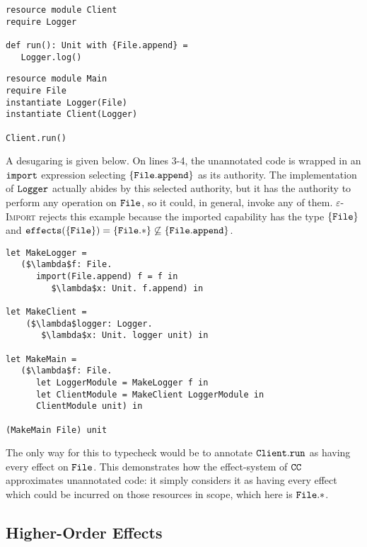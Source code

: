 \begin{lstlisting}
resource module Client
require Logger

def run(): Unit with {File.append} =
   Logger.log()
\end{lstlisting}

\begin{lstlisting}
resource module Main
require File
instantiate Logger(File)
instantiate Client(Logger)

Client.run()
\end{lstlisting}

A desugaring is given below. On lines 3-4, the unannotated code is wrapped in an $\mathtt{import}$ expression selecting $\{ \mathtt{File.append} \}$ as its authority. The implementation of $\mathtt{Logger}$ actually abides by this selected authority, but it has the authority to perform any operation on $\mathtt{File}$, so it could, in general, invoke any of them. \textsc{$\varepsilon$-Import} rejects this example because the imported capability has the type $\{ \mathtt{File} \}$ and $\mathtt{effects}(\{ \mathtt{File} \}) = \{ \mathtt{File}.* \} \not\subseteq \{ \mathtt{ File.append } \}$.

\begin{lstlisting}
let MakeLogger =
   ($\lambda$f: File.
      import(File.append) f = f in
         $\lambda$x: Unit. f.append) in

let MakeClient =
	($\lambda$logger: Logger.
	   $\lambda$x: Unit. logger unit) in

let MakeMain =
   ($\lambda$f: File.
      let LoggerModule = MakeLogger f in
      let ClientModule = MakeClient LoggerModule in
      ClientModule unit) in

(MakeMain File) unit
\end{lstlisting}

The only way for this to typecheck would be to annotate $\mathtt{Client.run}$ as having every effect on $\mathtt{File}$. This demonstrates how the effect-system of $\mathtt{CC}$ approximates unannotated code: it simply considers it as having every effect which could be incurred on those resources in scope, which here is $\mathtt{File}.*$.


















\subsection{Higher-Order Effects}

